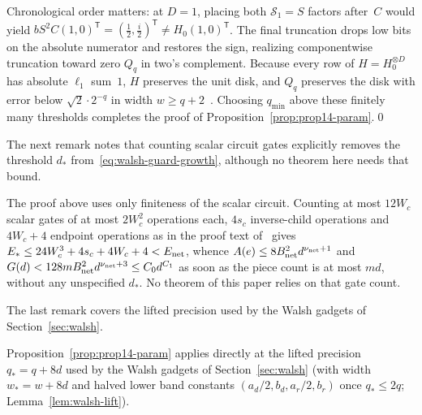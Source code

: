 Chronological order matters: at $D=1$, placing both $\mathcal S_1=S$ factors after~$C$ would yield $bS^2C(1,0)^{\mathsf T}=(\frac12,\frac i2)^{\mathsf T}\ne H_0(1,0)^{\mathsf T}$. The final truncation drops low bits on the absolute numerator and restores the sign, realizing componentwise truncation toward zero $Q_q$ in two's complement. Because every row of $H=H_0^{\otimes D}$ has absolute $\ell_1$ sum~$1$, $H$ preserves the unit disk, and $Q_q$ preserves the disk with error below $\sqrt2\cdot2^{-q}$ in width $w\ge q+2$~\cite[proof of Prop.~14, p.~38]{OAI26}. Choosing $q_{\min}$ above these finitely many thresholds completes the proof of Proposition~\ref{prop:prop14-param}.\qed

The next remark notes that counting scalar circuit gates explicitly removes the threshold $d_*$ from~\eqref{eq:walsh-guard-growth}, although no theorem here needs that bound.

\begin{remark}\label{rem:transfer-guard-explicit}
The proof above uses only finiteness of the scalar circuit. Counting at most $12W_c$ scalar gates of at most $2W_c^2$
operations each, $4s_c$ inverse-child operations and $4W_c+4$ endpoint operations as in the proof text
of~\cite[\S5.4, pp.~35--36]{OAI26} gives $E_*\le24W_c^3+4s_c+4W_c+4<E_{\rm net}$, whence
$A(e)\le8B_{\rm net}^2d^{\nu_{\mathrm{net}}+1}$ and $G(d)<128mB_{\rm net}^2d^{\nu_{\mathrm{net}}+3}\le C_0d^{C_1}$ as soon as the piece count is at
most $md$, without any unspecified $d_*$. No theorem of this paper relies on that gate count.
\end{remark}

The last remark covers the lifted precision used by the Walsh gadgets of Section~\ref{sec:walsh}.

\begin{remark}\label{rem:transfer-lift}
Proposition~\ref{prop:prop14-param} applies directly at the lifted precision $q_*=q+8d$ used by the Walsh gadgets of
Section~\ref{sec:walsh} (with width $w_*=w+8d$ and halved lower band constants $(a_d/2,b_d,a_r/2,b_r)$ once $q_*\le2q$;
Lemma~\ref{lem:walsh-lift}).
\end{remark}
